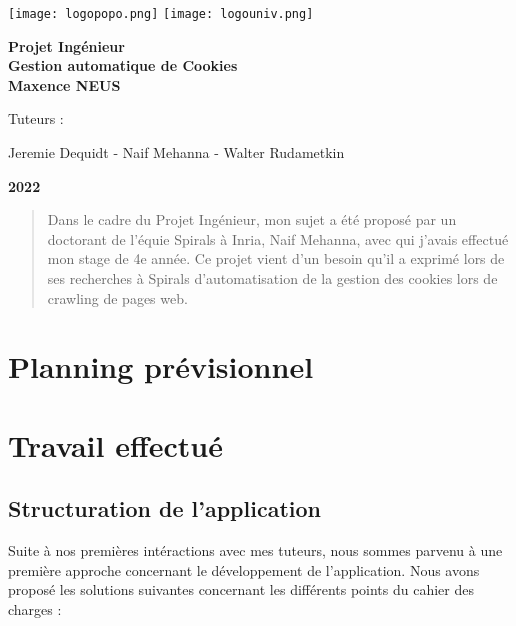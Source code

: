 \documentclass[oneside,a4paper,12pt]{article}
\begin{document}
	\begin{titlepage}
		\texttt{[image: logopopo.png]}
		\hspace*{\fill}
		\texttt{[image: logouniv.png]}
		
		\begin{center}
			\vspace{1cm}
			\textbf{Projet Ingénieur}\\
			\vspace{1cm}
			\textbf{\LARGE Gestion automatique de Cookies}\\
			\vspace{1cm}
			\textbf{Maxence NEUS}\\
			\vspace{1cm}
			
			\vspace{2cm}
			\vspace{\fill}
			\small Tuteurs :
			
			Jeremie Dequidt - Naif Mehanna - Walter Rudametkin
			
			\normalsize
			\vspace{2em}
			\textbf{2022}\\
		\end{center}
	\end{titlepage}
	
	\tableofcontents
	\vfill
	\begin{abstract}
		Dans le cadre du Projet Ingénieur, mon sujet a été proposé par un doctorant de l'équie Spirals à Inria, Naif Mehanna, avec qui j'avais effectué mon stage de 4e année. 
		Ce projet vient d'un besoin qu'il a exprimé lors de ses recherches à Spirals d'automatisation de la gestion des cookies lors de crawling de pages web.
	\end{abstract}
	
	
	
	
	\section{Planning prévisionnel}
	
	\section{Travail effectué}
	\subsection{Structuration de l'application}
	\label{structure}
	Suite à nos premières intéractions avec mes tuteurs, nous sommes parvenu à une première approche concernant le développement de l'application. Nous avons proposé les solutions suivantes concernant les différents points du cahier des charges :
	
\end{document}
